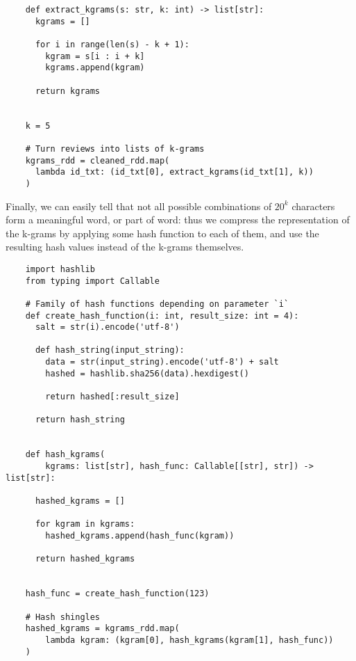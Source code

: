 \documentclass{article}
\begin{document}
  \begin{verbatim}
    def extract_kgrams(s: str, k: int) -> list[str]:
      kgrams = []

      for i in range(len(s) - k + 1):
        kgram = s[i : i + k]
        kgrams.append(kgram)

      return kgrams


    k = 5

    # Turn reviews into lists of k-grams
    kgrams_rdd = cleaned_rdd.map(
      lambda id_txt: (id_txt[0], extract_kgrams(id_txt[1], k))
    )
  \end{verbatim}
  Finally, we can easily tell that not all possible combinations of
  \( { 20 }^k \) characters form a meaningful word, or part of word: thus we
  compress the representation of the k-grams by applying some hash function to
  each of them, and use the resulting hash values instead of the k-grams
  themselves. \\
  \begin{verbatim}
    import hashlib
    from typing import Callable

    # Family of hash functions depending on parameter `i`
    def create_hash_function(i: int, result_size: int = 4):
      salt = str(i).encode('utf-8')

      def hash_string(input_string):
        data = str(input_string).encode('utf-8') + salt
        hashed = hashlib.sha256(data).hexdigest()

        return hashed[:result_size]

      return hash_string


    def hash_kgrams(
        kgrams: list[str], hash_func: Callable[[str], str]) -> list[str]:

      hashed_kgrams = []

      for kgram in kgrams:
        hashed_kgrams.append(hash_func(kgram))

      return hashed_kgrams


    hash_func = create_hash_function(123)

    # Hash shingles
    hashed_kgrams = kgrams_rdd.map(
        lambda kgram: (kgram[0], hash_kgrams(kgram[1], hash_func))
    )
  \end{verbatim}
\end{document}
